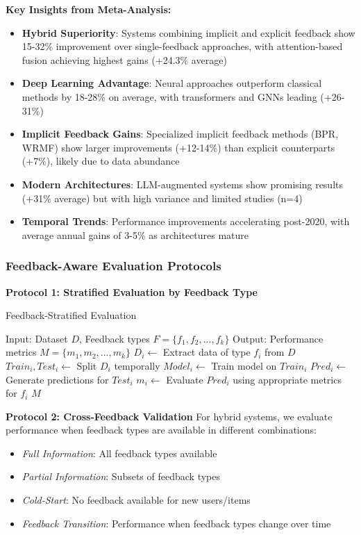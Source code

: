 \textbf{Key Insights from Meta-Analysis:}
\begin{itemize}
    \item \textbf{Hybrid Superiority}: Systems combining implicit and explicit feedback show 15-32\% improvement over single-feedback approaches, with attention-based fusion achieving highest gains (+24.3\% average)
    \item \textbf{Deep Learning Advantage}: Neural approaches outperform classical methods by 18-28\% on average, with transformers and GNNs leading (+26-31\%)
    \item \textbf{Implicit Feedback Gains}: Specialized implicit feedback methods (BPR, WRMF) show larger improvements (+12-14\%) than explicit counterparts (+7\%), likely due to data abundance
    \item \textbf{Modern Architectures}: LLM-augmented systems show promising results (+31\% average) but with high variance and limited studies (n=4)
    \item \textbf{Temporal Trends}: Performance improvements accelerating post-2020, with average annual gains of 3-5\% as architectures mature
\end{itemize}

\subsubsection{Feedback-Aware Evaluation Protocols}

\textbf{Protocol 1: Stratified Evaluation by Feedback Type}
\begin{algorithm}[h]
\caption{Feedback-Stratified Evaluation}
\begin{algorithmic}[1]
\STATE Input: Dataset $D$, Feedback types $F = \{f_1, f_2, ..., f_k\}$
\STATE Output: Performance metrics $M = \{m_1, m_2, ..., m_k\}$
    \STATE $D_i \leftarrow$ Extract data of type $f_i$ from $D$
    \STATE $Train_i, Test_i \leftarrow$ Split $D_i$ temporally
    \STATE $Model_i \leftarrow$ Train model on $Train_i$
    \STATE $Pred_i \leftarrow$ Generate predictions for $Test_i$
    \STATE $m_i \leftarrow$ Evaluate $Pred_i$ using appropriate metrics for $f_i$
\ENDFOR
\RETURN $M$
\end{algorithmic}
\end{algorithm}

\textbf{Protocol 2: Cross-Feedback Validation}
For hybrid systems, we evaluate performance when feedback types are available in different combinations:
\begin{itemize}
    \item \textit{Full Information}: All feedback types available
    \item \textit{Partial Information}: Subsets of feedback types
    \item \textit{Cold-Start}: No feedback available for new users/items
    \item \textit{Feedback Transition}: Performance when feedback types change over time
\end{itemize}

